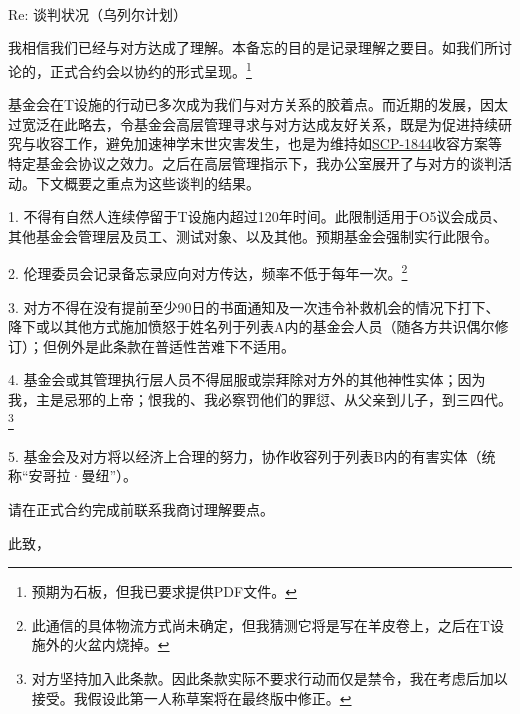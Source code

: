 \begin{scpbox}


\\
\\
\\

Re: 谈判状况（乌列尔计划）

我相信我们已经与对方达成了理解。本备忘的目的是记录理解之要目。如我们所讨论的，正式合约会以协约的形式呈现。\footnote{预期为石板，但我已要求提供PDF文件。}


基金会在T设施的行动已多次成为我们与对方关系的胶着点。而近期的发展，因太过宽泛在此略去，令基金会高层管理寻求与对方达成友好关系，既是为促进持续研究与收容工作，避免加速神学末世灾害发生，也是为维持如\hyperref[chap:SCP-1844]{SCP-1844}收容方案等特定基金会协议之效力。之后在高层管理指示下，我办公室展开了与对方的谈判活动。下文概要之重点为这些谈判的结果。


1. 不得有自然人连续停留于T设施内超过120年时间。此限制适用于O5议会成员、其他基金会管理层及员工、测试对象、以及其他。预期基金会强制实行此限令。

2. 伦理委员会记录备忘录应向对方传达，频率不低于每年一次。\footnote{此通信的具体物流方式尚未确定，但我猜测它将是写在羊皮卷上，之后在T设施外的火盆内烧掉。}

3. 对方不得在没有提前至少90日的书面通知及一次违令补救机会的情况下打下、降下或以其他方式施加愤怒于姓名列于列表A内的基金会人员（随各方共识偶尔修订）；但例外是此条款在普适性苦难下不适用。

4. 基金会或其管理执行层人员不得屈服或崇拜除对方外的其他神性实体；因为我，主是忌邪的上帝；恨我的、我必察罚他们的罪愆、从父亲到儿子，到三四代。\footnote{对方坚持加入此条款。因此条款实际不要求行动而仅是禁令，我在考虑后加以接受。我假设此第一人称草案将在最终版中修正。}

5. 基金会及对方将以经济上合理的努力，协作收容列于列表B内的有害实体（统称“安哥拉·曼纽”）。

请在正式合约完成前联系我商讨理解要点。

此致，


\end{scpbox}
